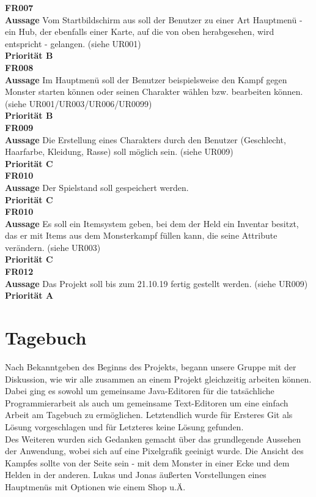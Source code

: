 \textbf{FR007} \\
\textbf{Aussage} Vom Startbildschirm aus soll der Benutzer zu einer Art Hauptmenü - ein \glqq{}Hub\grqq{}, der ebenfalls einer Karte, auf die von oben herabgesehen, wird entspricht - gelangen. (siehe UR001) \\
\textbf{Priorität B} \\

\textbf{FR008} \\
\textbf{Aussage} Im Hauptmenü soll der Benutzer beispielsweise den Kampf gegen Monster starten können oder seinen Charakter wählen bzw. bearbeiten können. (siehe UR001/UR003/UR006/UR0099) \\
\textbf{Priorität B} \\

\textbf{FR009} \\
\textbf{Aussage} Die Erstellung eines Charakters durch den Benutzer (Geschlecht, Haarfarbe, Kleidung, Rasse) soll möglich sein. (siehe UR009) \\
\textbf{Priorität C} \\

\textbf{FR010} \\
\textbf{Aussage} Der Spielstand soll gespeichert werden. \\
\textbf{Priorität C} \\

\textbf{FR010} \\
\textbf{Aussage} Es soll ein Itemsystem geben, bei dem der Held ein Inventar besitzt, das er mit Items aus dem Monsterkampf füllen kann, die seine Attribute verändern. (siehe UR003) \\
\textbf{Priorität C} \\

\textbf{FR012} \\
\textbf{Aussage} Das Projekt soll bis zum 21.10.19 fertig gestellt werden. (siehe UR009) \\
\textbf{Priorität A} \\

\newpage

\section{Tagebuch}
\label{Tagebuch}


Nach Bekanntgeben des Beginns des Projekts, begann unsere Gruppe mit der Diskussion, wie wir alle zusammen an einem Projekt gleichzeitig arbeiten können. Dabei ging es sowohl um gemeinsame Java-Editoren für die tatsächliche Programmierarbeit als auch um gemeinsame Text-Editoren um eine einfach Arbeit am Tagebuch zu ermöglichen. Letztendlich wurde für Ersteres Git als Lösung vorgeschlagen und für Letzteres keine Lösung gefunden. \\
Des Weiteren wurden sich Gedanken gemacht über das grundlegende Aussehen der Anwendung, wobei sich auf eine \glqq{}Pixelgrafik\grqq{} geeinigt wurde. Die Ansicht des Kampfes sollte von der Seite sein - mit dem Monster in einer Ecke und dem Helden in der anderen. Lukas und Jonas äußerten Vorstellungen eines Hauptmenüs mit Optionen wie einem Shop u.Ä. \\

